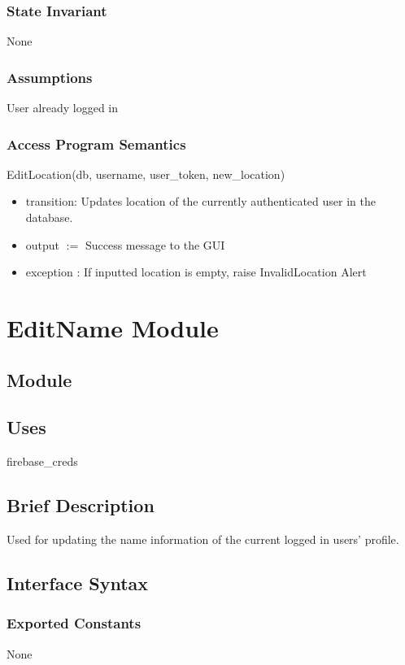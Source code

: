 \documentclass[12pt, titlepage]{article}
\begin{document}
\subsubsection{State Invariant}
None

\subsubsection{Assumptions}
User already logged in
\subsubsection{Access Program Semantics}
EditLocation(db, username, user\_token, new\_location)
\begin{itemize}
    \item transition: Updates location of the currently authenticated user in the database.
    \item output $:= $ Success message to the GUI
    \item exception : If inputted location is empty, raise InvalidLocation Alert
\end{itemize}






\newpage
\section* {EditName Module}

\subsection*{Module}

\subsection* {Uses}
firebase\_creds

\subsection* {Brief Description}
Used for updating the name information of the current logged in users' profile.

\subsection* {Interface Syntax}
\subsubsection* {Exported Constants}
None
\end{document}
